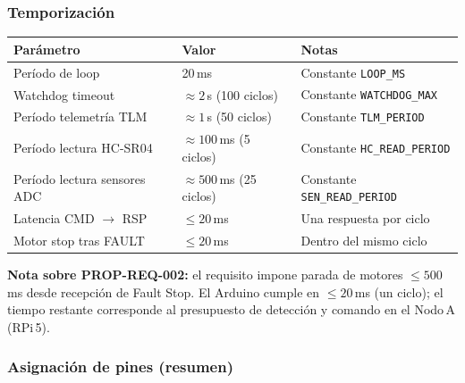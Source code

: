 \subsubsection{Temporización}

\begin{center}
\small
\renewcommand{\arraystretch}{1.3}
\begin{tabular}{lll}
\toprule
\textbf{Parámetro} & \textbf{Valor} & \textbf{Notas} \\
\midrule
Período de loop              & 20\,ms     & Constante \texttt{LOOP\_MS} \\
Watchdog timeout             & $\approx 2$\,s (100 ciclos) & Constante \texttt{WATCHDOG\_MAX} \\
Período telemetría TLM       & $\approx 1$\,s (50 ciclos)  & Constante \texttt{TLM\_PERIOD} \\
Período lectura HC-SR04      & $\approx 100$\,ms (5 ciclos) & Constante \texttt{HC\_READ\_PERIOD} \\
Período lectura sensores ADC & $\approx 500$\,ms (25 ciclos) & Constante \texttt{SEN\_READ\_PERIOD} \\
Latencia CMD $\rightarrow$ RSP & $\leq 20$\,ms & Una respuesta por ciclo \\
Motor stop tras FAULT        & $\leq 20$\,ms & Dentro del mismo ciclo \\
\bottomrule
\end{tabular}
\end{center}

\noindent\textbf{Nota sobre PROP-REQ-002:} el requisito impone
parada de motores $\leq 500$\,ms desde recepción de Fault Stop.
El Arduino cumple en $\leq 20$\,ms (un ciclo);
el tiempo restante corresponde al presupuesto de detección
y comando en el Nodo\,A (RPi\,5).

\subsubsection{Asignación de pines (resumen)}

